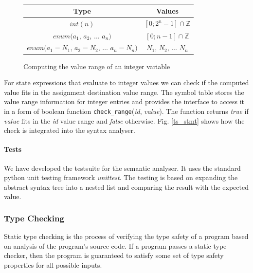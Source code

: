 
\begin{figure}[h!]
\centering
\begin{tabular}{|c|c|}
\hline
Type & Values\\
\hline
$int(n)$ & $[0; 2^{n}-1] \cap \mathbb{Z}$\\
\hline
$enum(a_1$, $a_2$, $\dots$ $a_n)$ & $[0; n-1] \cap \mathbb{Z}$\\
\hline
$enum(a_1=N_1$, $a_2=N_2$, $\dots$ $a_n=N_n)$ & $N_1$, $N_2$, $\dots$ $N_n$\\
\hline
\end{tabular}
\caption{Computing the value range of an integer variable\label{int_range}}
\end{figure}

For state expressions that evaluate to integer values we can check if the computed value fits in the assignment destination value range. The symbol table stores the value range information for integer entries and provides the interface to access it in a form of boolean function \texttt{check\_range}(\emph{id}, \emph{value}). The function returns \emph{true} if \emph{value} fits in the \emph{id} value range and \emph{false} otherwise. Fig. \ref{ts_stmt} shows how the check is integrated into the syntax analyser.



    \paragraph{Tests}
We have developed the testsuite for the semantic analyser. It uses the standard python unit testing framework \emph{unittest}. The testing is based on expanding the abstract syntax tree into a nested list and comparing the result with the expected value.


  \subsubsection{Type Checking\label{type_check}}
Static type checking is the process of verifying the type safety of a program based on analysis of the program's source code. If a program passes a static type checker, then the program is guaranteed to satisfy some set of type safety properties for all possible inputs.

